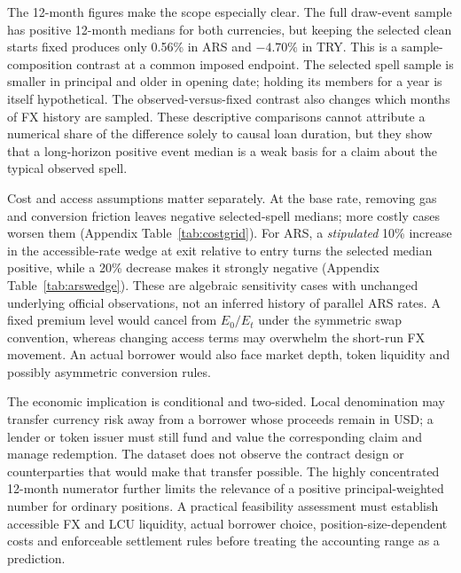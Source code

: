\documentclass[sn-vancouver,Numbered]{sn-jnl}
\begin{document}
The 12-month figures make the scope especially clear. The full draw-event sample has positive 12-month medians for both currencies, but keeping the selected clean starts fixed produces only 0.56\% in ARS and $-4.70\%$ in TRY. This is a sample-composition contrast at a common imposed endpoint. The selected spell sample is smaller in principal and older in opening date; holding its members for a year is itself hypothetical. The observed-versus-fixed contrast also changes which months of FX history are sampled. These descriptive comparisons cannot attribute a numerical share of the difference solely to causal loan duration, but they show that a long-horizon positive event median is a weak basis for a claim about the typical observed spell.

Cost and access assumptions matter separately. At the base rate, removing gas and conversion friction leaves negative selected-spell medians; more costly cases worsen them (Appendix Table~\ref{tab:costgrid}). For ARS, a \emph{stipulated} 10\% increase in the accessible-rate wedge at exit relative to entry turns the selected median positive, while a 20\% decrease makes it strongly negative (Appendix Table~\ref{tab:arswedge}). These are algebraic sensitivity cases with unchanged underlying official observations, not an inferred history of parallel ARS rates. A fixed premium level would cancel from $E_0/E_t$ under the symmetric swap convention, whereas changing access terms may overwhelm the short-run FX movement. An actual borrower would also face market depth, token liquidity and possibly asymmetric conversion rules.

The economic implication is conditional and two-sided. Local denomination may transfer currency risk away from a borrower whose proceeds remain in USD; a lender or token issuer must still fund and value the corresponding claim and manage redemption. The dataset does not observe the contract design or counterparties that would make that transfer possible. The highly concentrated 12-month numerator further limits the relevance of a positive principal-weighted number for ordinary positions. A practical feasibility assessment must establish accessible FX and LCU liquidity, actual borrower choice, position-size-dependent costs and enforceable settlement rules before treating the accounting range as a prediction.
\end{document}
